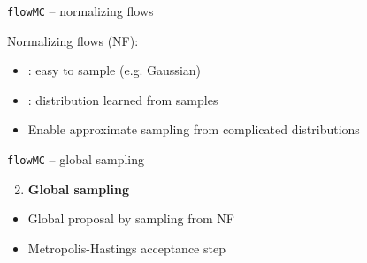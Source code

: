   
  
  \begin{frame}{\texttt{flowMC} -- normalizing flows}
  
  \def\x{3mm}
  \def\y{5mm}
  
  Normalizing flows (NF):
  
  \vspace{\x}
  
  \begin{itemize}
    \item {}: easy to sample (e.g. Gaussian)
    
    \vspace{\x}
  
    \item {}: distribution learned from samples
    
    \vspace{\x}
    
    \item Enable approximate sampling from complicated distributions
  \end{itemize}
  
  \vspace{\y}
    
  
  \end{frame}
  
  
  \begin{frame}{\texttt{flowMC} -- global sampling}
  
    \def\x{3mm}
    \def\y{2mm}
  
    \begin{enumerate}
      \setcounter{enumi}{1}
      \item \textbf{Global sampling}
    \end{enumerate}
  
    \vspace{\x}
  
    \begin{itemize}
      \item Global proposal by sampling from NF
      
      \vspace{\y}
      
      \item Metropolis-Hastings acceptance step
    \end{itemize}
  
    \vspace{8mm}
    
  
  \end{frame}
  
